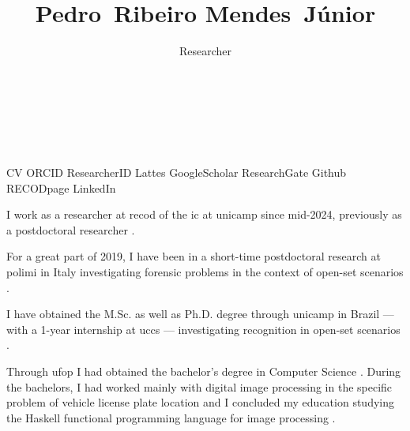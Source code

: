 

\title{Pedro~Ribeiro Mendes~Júnior}

\author{Researcher\\%
  \\%
  \\%
  \\%
  \\%
}
\date{}



\maketitle

\begin{tags}
  \gls{CV}
  \gls{ORCID}
  \gls{ResearcherID}
  \gls{Lattes}
  \gls{GoogleScholar}
  \gls{ResearchGate}
  \gls{Github}
  \gls{RECODpage}
  \gls{LinkedIn}
\end{tags}

I work as a researcher at \gls{recod} of the \gls{ic} at \gls{unicamp} since mid-2024, previously as a postdoctoral researcher .

For a great part of 2019, I have been in a short-time postdoctoral research at \gls{polimi} in Italy investigating forensic problems in the context of open-set scenarios .

I have obtained the M.Sc.  as well as Ph.D. degree  through \gls{unicamp} in Brazil --- with a 1-year internship at \gls{uccs} ---  investigating recognition in open-set scenarios .

Through \gls{ufop} I had obtained the bachelor's degree in Computer Science .
During the bachelors, I had worked mainly with digital image processing in the specific problem of vehicle license plate location  and I concluded my education studying the Haskell functional programming language for image processing .

